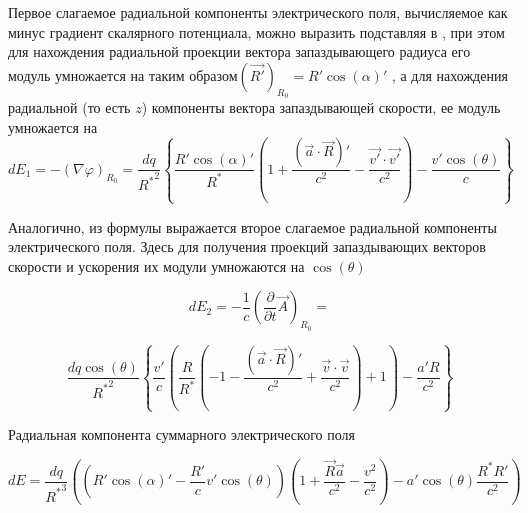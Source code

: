 \documentclass[12pt]{article}
\begin{document}
Первое слагаемое радиальной компоненты электрического поля, вычисляемое как минус градиент скалярного потенциала, можно выразить подставляя  в  , при этом для нахождения радиальной проекции вектора запаздывающего радиуса его модуль умножается на  таким образом${{\left( \overrightarrow{R'} \right)}_{{{R}_{0}}}}=R'\cos \left( \alpha  \right)'$ , а для нахождения радиальной (то есть $z$) компоненты вектора запаздывающей скорости, ее модуль умножается на 
	\[d{{E}_{1}}=-{{\left( \nabla \varphi  \right)}_{{{R}_{0}}}}=\frac{dq}{{{R}^{*}}^{2}}\left\{ \frac{R'\cos \left( \alpha  \right)'}{{{R}^{*}}}\left( 1+\frac{\left( \overrightarrow{a}\cdot \overrightarrow{R} \right)'}{{{c}^{2}}}-\frac{\overrightarrow{v'}\cdot \overrightarrow{v'}}{{{c}^{2}}} \right)-\frac{v'\cos \left( \theta  \right)}{c} \right\}\]

Аналогично, из формулы  выражается второе слагаемое радиальной компоненты электрического поля. Здесь для получения проекций запаздывающих векторов скорости и ускорения их модули умножаются на $\cos \left( \theta  \right)$

	\[d{{E}_{2}}=-\frac{1}{c}{{\left( \frac{\partial }{\partial t}\overrightarrow{A} \right)}_{{{R}_{0}}}}=\]

\[\frac{dq\cos \left( \theta  \right)}{{{R}^{*}}^{2}}\left\{ \frac{v'}{c}\left( \frac{R}{{{R}^{*}}}\left( -1-\frac{\left( \overrightarrow{a}\cdot \overrightarrow{R} \right)'}{{{c}^{2}}}+\frac{\overrightarrow{v}\cdot \overrightarrow{v}}{{{c}^{2}}} \right)+1 \right)-\frac{a'R}{{{c}^{2}}} \right\}\] 

Радиальная компонента суммарного электрического поля

$$dE = \frac{dq}{{{R}^{*}}^{3}} \left( \left({R'\cos \left( \alpha  \right)'}-\frac{R'}{c}{v'\cos \left( \theta  \right)} \right) \left(1 + \frac{\vec{R}\vec{a}}{c^2} - \frac{v^2}{c^2} \right) - {a' \cos \left( \theta  \right)}\frac{{R}^{*}R'}{c^2} \right)$$




\end{document}
